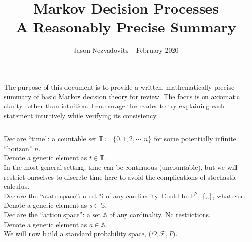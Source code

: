 





\title{\textbf{Markov Decision Processes}\\ \large{A Reasonably Precise Summary}\vspace{-6ex}}
\author{\vspace{-5ex}}
\date{\small{Jason Nezvadovitz -- February 2020}}
\maketitle


The purpose of this document is to provide a written, mathematically precise summary of basic Markov decision theory for review. The focus is on axiomatic clarity rather than intuition. I encourage the reader to try explaining each statement intuitively while verifying its consistency.

\vspace{0.2in}
\hrule
\vspace{0.2in}

Declare ``time'': a countable set $\mathbb{T} \coloneqq \{0, 1, 2, \cdots, n\}$ for some potentially infinite ``horizon'' $n$.\\
Denote a generic element as $t \in \mathbb{T}$.\\

In the most general setting, time can be continuous (uncountable), but we will restrict ourselves to discrete time here to avoid the complications of stochastic calculus.\\

Declare the ``state space'': a set $\mathbb{S}$ of any cardinality. Could be $\mathbb{R}^2$, \{\Smiley,\Cooley,\Winkey\}, whatever.\\
Denote a generic element as $s \in \mathbb{S}$.\\

Declare the ``action space'': a set $\mathbb{A}$ of any cardinality. No restrictions.\\
Denote a generic element as $a \in \mathbb{A}$.\\

We will now build a standard \href{https://en.wikipedia.org/wiki/Probability_space}{probability space}, $\boldsymbol{(}\Omega, \mathcal{F}, P\boldsymbol{)}$.\\

